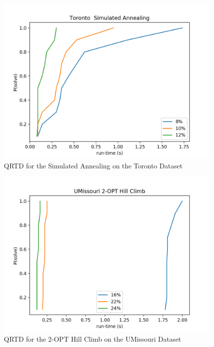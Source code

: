 \documentclass[format=sigconf]{acmart}
\begin{document}
\begin{figure}[htbp]
    \centerline{\includegraphics[scale=.5]{graphs/Toronto_LS2_QRTD.png}}
    \caption{QRTD for the Simulated Annealing on the Toronto Dataset}
    \label{fig:2}
\end{figure}

\begin{figure}[htbp]
    \centerline{\includegraphics[scale=.5]{graphs/UMissouri_LS1_QRTD.png}}
    \caption{QRTD for the 2-OPT Hill Climb on the UMissouri Dataset}
    \label{fig:3}
\end{figure}
\end{document}
